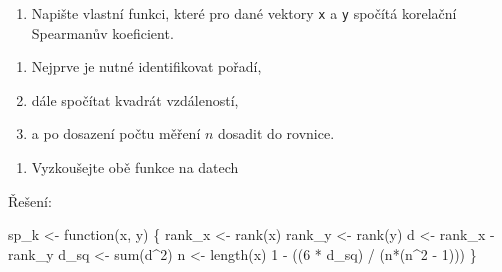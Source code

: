 \documentclass[
  letterpaper,
  DIV=11,
  numbers=noendperiod]{scrreprt}
\newenvironment{Shaded}{\begin{snugshade}}{\end{snugshade}}
\newcommand{\ControlFlowTok}[1]{\textcolor[rgb]{0.00,0.23,0.31}{#1}}
\newcommand{\DecValTok}[1]{\textcolor[rgb]{0.68,0.00,0.00}{#1}}
\newcommand{\FunctionTok}[1]{\textcolor[rgb]{0.28,0.35,0.67}{#1}}
\newcommand{\NormalTok}[1]{\textcolor[rgb]{0.00,0.23,0.31}{#1}}
\newcommand{\OtherTok}[1]{\textcolor[rgb]{0.00,0.23,0.31}{#1}}
\newcommand{\SpecialCharTok}[1]{\textcolor[rgb]{0.37,0.37,0.37}{#1}}
\providecommand{\tightlist}{%
  \setlength{\itemsep}{0pt}\setlength{\parskip}{0pt}}\usepackage{longtable,booktabs,array}
\begin{document}
\begin{tcolorbox}[enhanced jigsaw, toprule=.15mm, breakable, title=\textcolor{quarto-callout-tip-color}{\faLightbulb}\hspace{0.5em}{Cvičení}, colframe=quarto-callout-tip-color-frame, bottomrule=.15mm, left=2mm, leftrule=.75mm, colbacktitle=quarto-callout-tip-color!10!white, colback=white, bottomtitle=1mm, toptitle=1mm, opacityback=0, opacitybacktitle=0.6, arc=.35mm, coltitle=black, rightrule=.15mm, titlerule=0mm]

\begin{enumerate}
\def\labelenumi{\arabic{enumi}.}
\tightlist
\item
  Napište vlastní funkci, které pro dané vektory \texttt{x} a \texttt{y}
  spočítá korelační Spearmanův koeficient.\\
\end{enumerate}

\begin{enumerate}
\def\labelenumi{\alph{enumi})}
\tightlist
\item
  Nejprve je nutné identifikovat pořadí,\\
\item
  dále spočítat kvadrát vzdáleností,\\
\item
  a po dosazení počtu měření \(n\) dosadit do rovnice.\\
\end{enumerate}

\begin{enumerate}
\def\labelenumi{\arabic{enumi}.}
\setcounter{enumi}{1}
\tightlist
\item
  Vyzkoušejte obě funkce na datech
\end{enumerate}

Řešení:\\

\begin{Shaded}
\begin{Highlighting}[]
\NormalTok{sp\_k }\OtherTok{\textless{}{-}} \ControlFlowTok{function}\NormalTok{(x, y) \{}
\NormalTok{  rank\_x }\OtherTok{\textless{}{-}} \FunctionTok{rank}\NormalTok{(x) }
\NormalTok{  rank\_y }\OtherTok{\textless{}{-}} \FunctionTok{rank}\NormalTok{(y) }
\NormalTok{  d }\OtherTok{\textless{}{-}}\NormalTok{ rank\_x }\SpecialCharTok{{-}}\NormalTok{ rank\_y }
\NormalTok{  d\_sq }\OtherTok{\textless{}{-}} \FunctionTok{sum}\NormalTok{(d}\SpecialCharTok{\^{}}\DecValTok{2}\NormalTok{) }
\NormalTok{  n }\OtherTok{\textless{}{-}} \FunctionTok{length}\NormalTok{(x) }
  \DecValTok{1} \SpecialCharTok{{-}}\NormalTok{ ((}\DecValTok{6} \SpecialCharTok{*}\NormalTok{ d\_sq) }\SpecialCharTok{/}\NormalTok{ (n}\SpecialCharTok{*}\NormalTok{(n}\SpecialCharTok{\^{}}\DecValTok{2} \SpecialCharTok{{-}} \DecValTok{1}\NormalTok{))) }
\NormalTok{\}}
\end{Highlighting}
\end{Shaded}


\end{tcolorbox}
\end{document}
